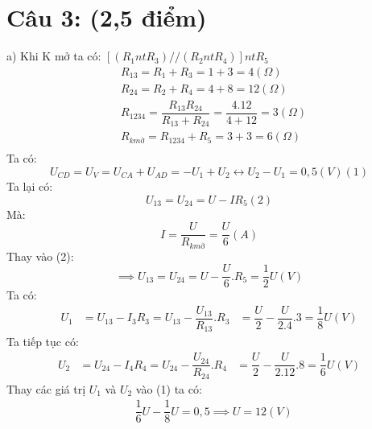 \documentclass[50pt]{article}
\begin{document}
\section*{Câu 3: (2,5 điểm)}
a) Khi K mở ta có: $[(R_{1} nt R_{3}) // (R_{2} nt R_{4})] nt R_{5}$\\
\begin{equation*}
    \begin{aligned}
        & R_{13} = R_{1} + R_{3} = 1 + 3 = 4 (\Omega)\\
        & R_{24} = R_{2} + R_{4} = 4 + 8 = 12 (\Omega)\\
        & R_{1234} = \dfrac{R_{13}R_{24}}{R_{13} + R_{24}} = \dfrac{4.12}{4 + 12} = 3 (\Omega) \\
        & R_{k mở} = R_{1234} + R_{5} = 3 + 3 = 6 (\Omega) \\
    \end{aligned}
\end{equation*}
Ta có:
\begin{equation*}
    U_{CD} = U_{V} = U_{CA} + U_{AD} = -U_{1} + U_{2}
    \leftrightarrow U_{2} - U_{1} = 0,5 (V) (1)
\end{equation*}
Ta lại có:
\begin{equation*}
    U_{13} = U_{24} = U - IR_{5} (2)
\end{equation*}
Mà:
\begin{equation*}
    I = \dfrac{U}{R_{k mở}} = \dfrac{U}{6} (A)
\end{equation*}
Thay vào (2):
\begin{equation*}
    \implies U_{13} = U_{24} = U - \dfrac{U}{6}.R_{5} = \dfrac{1}{2}U (V)
\end{equation*}
Ta có:
\begin{equation*}
    \begin{aligned}
        U_{1} & = U_{13} - I_{3}R_{3} = U_{13} - \dfrac{U_{13}}{R_{13}}.R_{3}
              & = \dfrac{U}{2} - \dfrac{U}{2.4}.3 = \dfrac{1}{8}U (V)
    \end{aligned}
\end{equation*}
Ta tiếp tục có:
\begin{equation*}
    \begin{aligned}
        U_{2} & = U_{24} - I_{4}R_{4} = U_{24} - \dfrac{U_{24}}{R_{24}}.R_{4}
              & = \dfrac{U}{2} - \dfrac{U}{2.12}.8 = \dfrac{1}{6}U (V)
    \end{aligned}
\end{equation*}
Thay các giá trị $U_{1}$ và $U_{2}$ vào (1) ta có:\\
\begin{equation*}
    \begin{aligned}
        & \dfrac{1}{6}U - \dfrac{1}{8}U = 0,5
        \implies U = 12 (V)
    \end{aligned}
\end{equation*}
\end{document}

